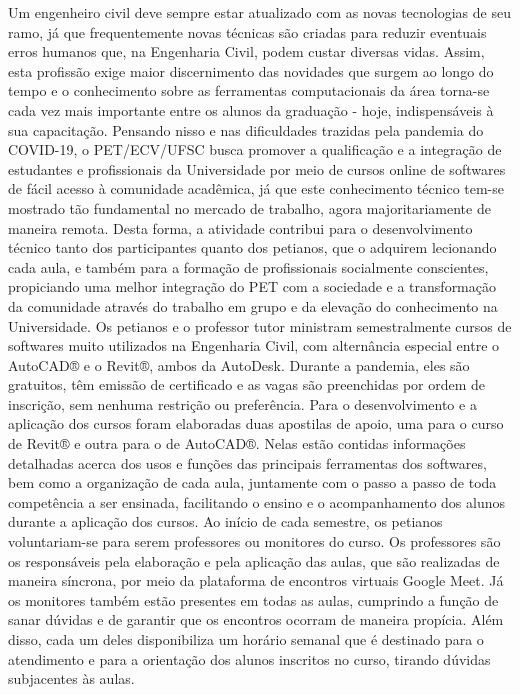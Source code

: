Um engenheiro civil deve sempre estar atualizado com as novas tecnologias de seu ramo,
já que frequentemente novas técnicas são criadas para reduzir eventuais erros humanos que, na
Engenharia Civil, podem custar diversas vidas. Assim, esta profissão exige maior discernimento
das novidades que surgem ao longo do tempo e o conhecimento sobre as ferramentas
computacionais da área torna-se cada vez mais importante entre os alunos da graduação - hoje,
indispensáveis à sua capacitação.
Pensando nisso e nas dificuldades trazidas pela pandemia do COVID-19, o
PET/ECV/UFSC busca promover a qualificação e a integração de estudantes e profissionais da
Universidade por meio de cursos online de softwares de fácil acesso à comunidade acadêmica, já
que este conhecimento técnico tem-se mostrado tão fundamental no mercado de trabalho, agora
majoritariamente de maneira remota.
Desta forma, a atividade contribui para o desenvolvimento técnico tanto dos participantes
quanto dos petianos, que o adquirem lecionando cada aula, e também para a formação de
profissionais socialmente conscientes, propiciando uma melhor integração do PET com a
sociedade e a transformação da comunidade através do trabalho em grupo e da elevação do
conhecimento na Universidade.
Os petianos e o professor tutor ministram semestralmente cursos de softwares muito
utilizados na Engenharia Civil, com alternância especial entre o AutoCAD® e o Revit®, ambos
da AutoDesk. Durante a pandemia, eles são gratuitos, têm emissão de certificado e as vagas são
preenchidas por ordem de inscrição, sem nenhuma restrição ou preferência.
Para o desenvolvimento e a aplicação dos cursos foram elaboradas duas apostilas de
apoio, uma para o curso de Revit® e outra para o de AutoCAD®. Nelas estão contidas
informações detalhadas acerca dos usos e funções das principais ferramentas dos softwares, bem
como a organização de cada aula, juntamente com o passo a passo de toda competência a ser
ensinada, facilitando o ensino e o acompanhamento dos alunos durante a aplicação dos cursos.
Ao início de cada semestre, os petianos voluntariam-se para serem professores ou
monitores do curso. Os professores são os responsáveis pela elaboração e pela aplicação das
aulas, que são realizadas de maneira síncrona, por meio da plataforma de encontros virtuais
Google Meet. Já os monitores também estão presentes em todas as aulas, cumprindo a função de
sanar dúvidas e de garantir que os encontros ocorram de maneira propícia. Além disso, cada um
deles disponibiliza um horário semanal que é destinado para o atendimento e para a orientação
dos alunos inscritos no curso, tirando dúvidas subjacentes às aulas.

